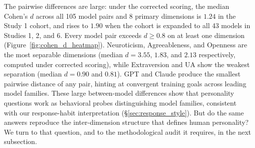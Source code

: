 \documentclass[11pt]{article}
\begin{document}
\begin{table}[!htb]
\centering
\caption{ANOVA results on the corrected scoring: model effect on each dimension (Study 1 paper cohort, $df = 14, 165$). Primary analysis uses 8 dimensions ($\alpha > 0.70$); HEXACO-H ($\alpha = 0.27$) shown for completeness. All $p < 0.001$ after FDR correction.}
\label{tab:anova_results}
\end{table}

The pairwise differences are large: under the corrected scoring, the median Cohen's $d$ across all 105 model pairs and 8 primary dimensions is $1.24$ in the Study 1 cohort, and rises to $1.90$ when the cohort is expanded to all 43 models in Studies 1, 2, and 6.
Every model pair exceeds $d \geq 0.8$ on at least one dimension (Figure~\ref{fig:cohen_d_heatmap}).
Neuroticism, Agreeableness, and Openness are the most separable dimensions (median $d = 3.55$, $1.83$, and $2.13$ respectively, computed under corrected scoring), while Extraversion and UA show the weakest separation (median $d = 0.90$ and $0.81$).
GPT and Claude produce the smallest pairwise distance of any pair, hinting at convergent training goals across leading model families.
These large between-model differences show that personality questions work as behavioral probes distinguishing model families, consistent with our response-habit interpretation (\S\ref{sec:response_style}).
But do the same answers reproduce the inter-dimension structure that defines human personality? We turn to that question, and to the methodological audit it requires, in the next subsection.
\end{document}

